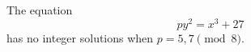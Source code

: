 \begin{proposition}\label{eq:060}
    The equation
\[
    py^2=x^3+27
\]
    has no integer solutions when $p=5,7\pmod8$.
\end{proposition}

